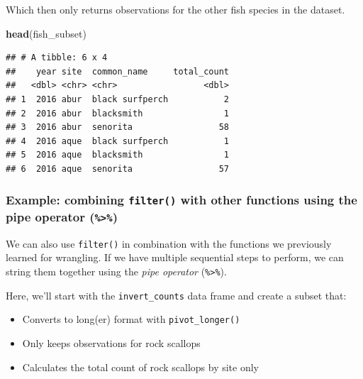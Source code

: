 \documentclass[]{book}
\newenvironment{Shaded}{\begin{snugshade}}{\end{snugshade}}
\newcommand{\KeywordTok}[1]{\textcolor[rgb]{0.13,0.29,0.53}{\textbf{#1}}}
\newcommand{\NormalTok}[1]{#1}
\providecommand{\tightlist}{%
  \setlength{\itemsep}{0pt}\setlength{\parskip}{0pt}}
\begin{document}
Which then only returns observations for the other fish species in the dataset.

\begin{Shaded}
\begin{Highlighting}[]
\KeywordTok{head}\NormalTok{(fish_subset)}
\end{Highlighting}
\end{Shaded}

\begin{verbatim}
## # A tibble: 6 x 4
##    year site  common_name     total_count
##   <dbl> <chr> <chr>                 <dbl>
## 1  2016 abur  black surfperch           2
## 2  2016 abur  blacksmith                1
## 3  2016 abur  senorita                 58
## 4  2016 aque  black surfperch           1
## 5  2016 aque  blacksmith                1
## 6  2016 aque  senorita                 57
\end{verbatim}

\hypertarget{example-combining-filter-with-other-functions-using-the-pipe-operator}{%
\subsubsection{\texorpdfstring{Example: combining \texttt{filter()} with other functions using the pipe operator (\texttt{\%\textgreater{}\%})}{Example: combining filter() with other functions using the pipe operator (\%\textgreater{}\%)}}\label{example-combining-filter-with-other-functions-using-the-pipe-operator}}

We can also use \texttt{filter()} in combination with the functions we previously learned for wrangling. If we have multiple sequential steps to perform, we can string them together using the \emph{pipe operator} (\texttt{\%\textgreater{}\%}).

Here, we'll start with the \texttt{invert\_counts} data frame and create a subset that:

\begin{itemize}
\tightlist
\item
  Converts to long(er) format with \texttt{pivot\_longer()}
\item
  Only keeps observations for rock scallops
\item
  Calculates the total count of rock scallops by site only
\end{itemize}
\end{document}
